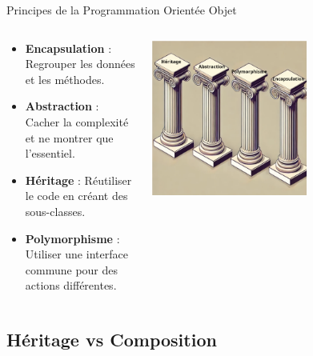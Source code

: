 \documentclass[aspectratio=169]{beamer}
\begin{document}
\begin{frame}{Principes de la Programmation Orientée Objet}
    \begin{columns}
        \begin{column}{0.6\textwidth}
            \begin{itemize}
                \item \textbf{Encapsulation} : Regrouper les données et les méthodes.
                \item \textbf{Abstraction} : Cacher la complexité et ne montrer que l'essentiel.
                \item \textbf{Héritage} : Réutiliser le code en créant des sous-classes.
                \item \textbf{Polymorphisme} : Utiliser une interface commune pour des actions différentes.
            \end{itemize}
        \end{column}
        \begin{column}{0.4\textwidth}
            \pause
            \begin{center}
                \includegraphics[width=0.6\textwidth]{pic/poo_principles.png}
            \end{center}
        \end{column}
    \end{columns}
\end{frame}

\subsection{Héritage vs Composition}
\end{document}
